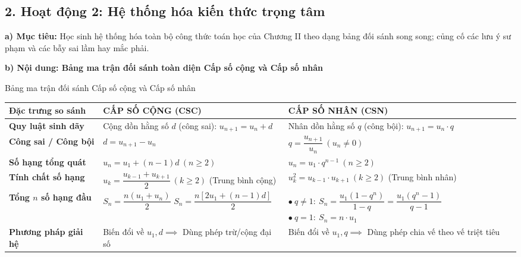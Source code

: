 \documentclass[12pt, a4paper]{article}
\begin{document}
\subsection*{2. Hoạt động 2: Hệ thống hóa kiến thức trọng tâm}

\noindent \textbf{a) Mục tiêu:}
Học sinh hệ thống hóa toàn bộ công thức toán học của Chương II theo dạng bảng đối sánh song song; củng cố các lưu ý sư phạm và các bẫy sai lầm hay mắc phải.

\noindent \textbf{b) Nội dung: Bảng ma trận đối sánh toàn diện Cấp số cộng và Cấp số nhân}
\begin{pedabox}{Bảng ma trận đối sánh Cấp số cộng và Cấp số nhân}
\begin{center}
\small
\begin{tabularx}{\textwidth}{|p{3.2cm}|X|X|}
\hline
\textbf{Đặc trưng so sánh} & \textbf{CẤP SỐ CỘNG (CSC)} & \textbf{CẤP SỐ NHÂN (CSN)} \\ \hline
\textbf{Quy luật sinh dãy} & Cộng dồn hằng số $d$ (công sai): \newline $u_{n+1} = u_n + d$ & Nhân dồn hằng số $q$ (công bội): \newline $u_{n+1} = u_n \cdot q$ \\ \hline
\textbf{Công sai / Công bội} & $d = u_{n+1} - u_n$ & $q = \dfrac{u_{n+1}}{u_n} \ (u_n \neq 0)$ \\ \hline
\textbf{Số hạng tổng quát} & $u_n = u_1 + (n - 1)d \ (n \ge 2)$ & $u_n = u_1 \cdot q^{n-1} \ (n \ge 2)$ \\ \hline
\textbf{Tính chất số hạng} & $u_k = \dfrac{u_{k-1} + u_{k+1}}{2} \ (k \ge 2)$ \newline (Trung bình cộng) & $u_k^2 = u_{k-1} \cdot u_{k+1} \ (k \ge 2)$ \newline (Trung bình nhân) \\ \hline
\textbf{Tổng $n$ số hạng đầu} & $S_n = \dfrac{n(u_1 + u_n)}{2}$ \newline $S_n = \dfrac{n[2u_1 + (n - 1)d]}{2}$ & $\bullet \ q \neq 1: \ S_n = \dfrac{u_1(1 - q^n)}{1 - q} = \dfrac{u_1(q^n - 1)}{q - 1}$ \newline $\bullet \ q = 1: \ S_n = n \cdot u_1$ \\ \hline
\textbf{Phương pháp giải hệ} & Biến đổi về $u_1, d \implies$ Dùng phép trừ/cộng đại số & Biến đổi về $u_1, q \implies$ Dùng phép chia vế theo vế triệt tiêu \\ \hline
\end{tabularx}
\end{center}
\end{pedabox}
\end{document}

